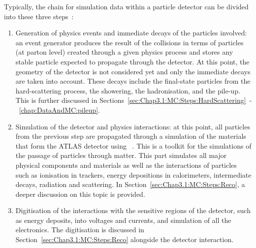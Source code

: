 Typically, the chain for simulation data within a particle detector can be divided into these three steps~\cite{SOFT-2010-01}:
\begin{enumerate}
    \item Generation of physics events and immediate decays of the particles involved: %
    		an event generator produces the result of the collisions in terms of 
		particles (at parton level) created through a given physics process and stores any
		stable particle expected to propagate through the detector. 
		At this point, the geometry of the detector
		is not considered yet and only the immediate decays are taken into account. These decays
		include the final-state particles from the hard-scattering process, the showering,
		the hadronisation, and the pile-up. 
		This is further discussed in Sections~\ref{sec:Chap3.1:MC:Steps:HardScattering}~-~\ref{chap:DataAndMC:pileup}.
		
		
		
    \item Simulation of the detector and physics interactions:  %
    		at this point, all particles from the previous step are propagated through 
		a simulation of the materials that form the ATLAS detector
		using \GEANT~\cite{GEANT4:2002zbu}. This is a toolkit for the simulations of the passage
		of particles through matter.
		This part simulates all major physical components and materials as well as the
		interactions of particles such as ionisation in trackers, energy depositions in calorimeters, intermediate
		decays, radiation and scattering. In Section~\ref{sec:Chap3.1:MC:Steps:Reco}, a deeper
		discussion on this topic is provided.
    		 
    \item 	Digitisation of the interactions with the sensitive regions of the detector, 
    		such as energy deposits, into voltages 
    		and currents, and simulation of all the electronics. 
		The digitisation is discussed
		in Section~\ref{sec:Chap3.1:MC:Steps:Reco}
		alongside the detector interaction.
\end{enumerate}

